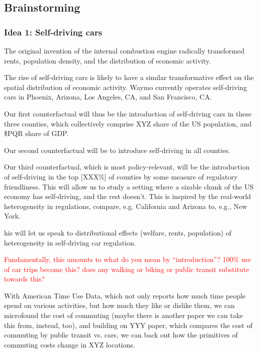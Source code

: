 \documentclass{article}
\begin{document}
\subsection{Brainstorming }

\subsubsection{Idea 1: Self-driving cars}
The original invention of the internal combustion engine
radically transformed rents, population density, and the distribution of economic activity. 

The rise of self-driving cars is likely to have a similar transformative effect on the spatial distribution of economic activity.
Waymo currently operates self-driving cars in Phoenix, Arizona, Los Angeles, CA, and San Francisco, CA.



Our first counterfactual will thus be the introduction of self-driving cars in these three counties, which collectively comprise 
XYZ share of the US population, and  \$PQR share of GDP.

Our second counterfactual will be to introduce self-driving in all counties.

Our third counterfactual, which is most policy-relevant, will be the introduction of self-driving in the top [XXX\%] of counties by some measure of regulatory friendliness.
 This will allow us to study a setting where a sizable chunk of the US economy has self-driving, and the rest doesn't. This is inspired by the real-world heterogeneity in regulations, compare, e.g. California and Arizona to, e.g., New York.
 
 his will let us speak to distributional effects (welfare, rents, population) of heterogeneity in self-driving car regulation.

\textcolor{red}{Fundamentally, this amounts to what do you mean by ``introduction''? 100\% use of car trips become this?
does any walking or biking or public transit substitute towards this?}

With American Time Use Data, which not only reports how much time people spend on various activities, but how much they like or dislike them, we can microfound the cost of commuting (maybe there is another paper we can take this from, instead, too), and building on YYY paper, which compares the cost of commuting by public transit vs. cars, 
we can back out how the primitives of commuting costs change in XYZ locations.
\end{document}
